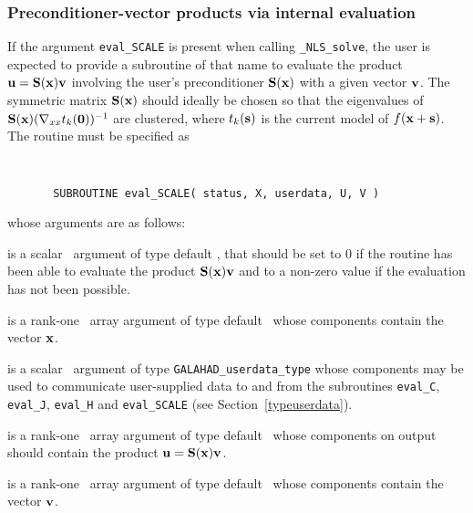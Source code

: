 \documentclass{galahad}
\newcommand{\packagename}{NLS}
\newcommand{\fullpackagename}{\libraryname\_\packagename}
\newcommand{\solver}{{\tt \fullpackagename\_solve}}
\begin{document}

\subsubsection{Preconditioner-vector products via internal evaluation\label{pv}}

If the argument {\tt eval\_SCALE} is present when calling \solver, the
user is expected to provide a subroutine of that name to evaluate the
product ${\mathbf{u}} = {\mathbf{S}}({\mathbf{x}}) {\mathbf{v}}$ involving the user's preconditioner
${\mathbf{S}}({\mathbf{x}})$ with a given vector ${\mathbf{v}}$. The symmetric matrix ${\mathbf{S}}({\mathbf{x}})$
should ideally be chosen so that the eigenvalues of
${\mathbf{S}}({\mathbf{x}}) (\nabla_{xx} t_k({\mathbf{0}}))^{-1}$ are clustered, where $t_k({\mathbf{s}})$
is the current model of $f({\mathbf{x}}+{\mathbf{s}})$.
The routine must be specified as

\def\baselinestretch{0.8}
{\tt
\begin{verbatim}
       SUBROUTINE eval_SCALE( status, X, userdata, U, V )
\end{verbatim} }
\def\baselinestretch{1.0}
\noindent whose arguments are as follows:

\begin{description}
 is a scalar \intentout\ argument of type default \integer,
that should be set to 0 if the routine has been able to evaluate the
product ${\mathbf{S}}({\mathbf{x}}) {\mathbf{v}}$
and to a non-zero value if the evaluation has not been possible.

 is a rank-one \intentin\ array argument of type default \realdp\
whose components contain the vector ${\mathbf{x}}$.

 is a scalar \intentinout\ argument of type
{\tt GALAHAD\_userdata\_type} whose components may be used
to communicate user-supplied data to and from the
subroutines {\tt eval\_C}, {\tt eval\_J},
{\tt eval\_H} and {\tt eval\_SCALE}
(see Section~\ref{typeuserdata}).

 is a rank-one \intentout\ array argument of type default \realdp\
whose components on output should contain the product ${\mathbf{u}} = {\mathbf{S}}({\mathbf{x}}) {\mathbf{v}}$.

\ittf{V} is a rank-one \intentin\ array argument of type default \realdp\
whose components contain the vector ${\mathbf{v}}$.

\end{description}

\end{document}
